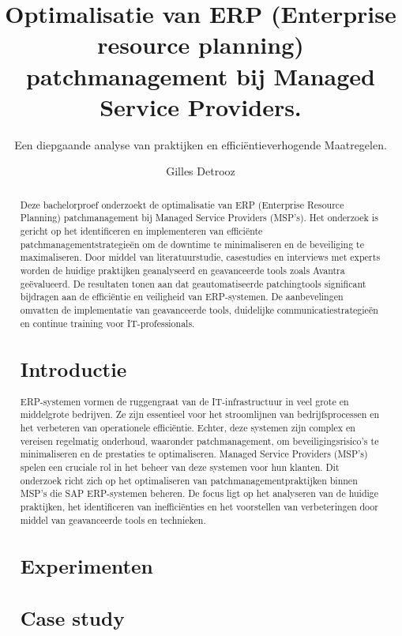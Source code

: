\documentclass[a0,portrait]{hogent-poster}
\title{Optimalisatie van ERP (Enterprise resource planning) patchmanagement bij Managed Service Providers.}
\subtitle{Een diepgaande analyse van praktijken en efficiëntieverhogende Maatregelen.}
\author{Gilles Detrooz}
\begin{document}
\maketitle

\begin{abstract}
  Deze bachelorproef onderzoekt de optimalisatie van ERP (Enterprise Resource Planning) patchmanagement bij Managed Service Providers (MSP's). Het onderzoek is gericht op het identificeren en implementeren van efficiënte patchmanagementstrategieën om de downtime te minimaliseren en de beveiliging te maximaliseren. Door middel van literatuurstudie, casestudies en interviews met experts worden de huidige praktijken geanalyseerd en geavanceerde tools zoals Avantra geëvalueerd. De resultaten tonen aan dat geautomatiseerde patchingtools significant bijdragen aan de efficiëntie en veiligheid van ERP-systemen. De aanbevelingen omvatten de implementatie van geavanceerde tools, duidelijke communicatiestrategieën en continue training voor IT-professionals.

\begin{multicols}{2} %

\section{Introductie}
ERP-systemen vormen de ruggengraat van de IT-infrastructuur in veel grote en middelgrote bedrijven. Ze zijn essentieel voor het stroomlijnen van bedrijfsprocessen en het verbeteren van operationele efficiëntie. Echter, deze systemen zijn complex en vereisen regelmatig onderhoud, waaronder patchmanagement, om beveiligingsrisico's te minimaliseren en de prestaties te optimaliseren. Managed Service Providers (MSP's) spelen een cruciale rol in het beheer van deze systemen voor hun klanten. Dit onderzoek richt zich op het optimaliseren van patchmanagementpraktijken binnen MSP's die SAP ERP-systemen beheren. De focus ligt op het analyseren van de huidige praktijken, het identificeren van inefficiënties en het voorstellen van verbeteringen door middel van geavanceerde tools en technieken.

\section{Experimenten}


\section{Case study}


\end{multicols}
\end{abstract}
\end{document}
